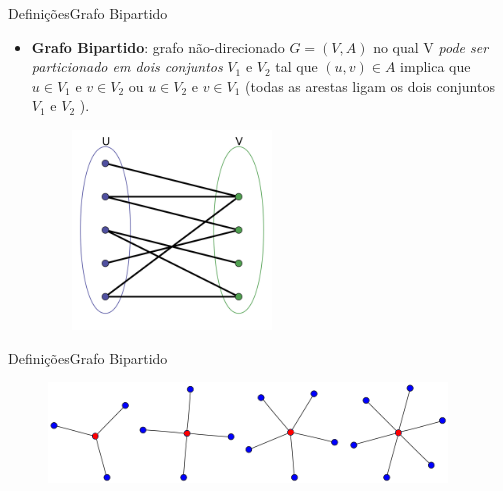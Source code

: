 \documentclass[aspectratio=169]{beamer}
\begin{document}

\begin{frame}{Definições}{Grafo Bipartido}
\begin{itemize}
\item {\bf Grafo Bipartido}: grafo não-direcionado $G = (V, A)$ no qual V {\it pode ser particionado em dois conjuntos} $V_1$ e $V_2$ tal que $(u, v) \in A$ implica que $u \in V_1$ e $v \in V_2$ ou $u \in V_2$ e $v \in V_1$ (todas as arestas ligam os dois conjuntos $V_1$ e $V_2$ ).

\begin{figure}[!h]
  \centering
  \includegraphics[width=150pt]{imagens/exemplo_grafo_bipartido.png}
  \label{fig_exemplo_grafo_bipartido}
\end{figure}
\end{itemize}
\end{frame}


\begin{frame}{Definições}{Grafo Bipartido}
\begin{figure}[!h]
  \centering
  \includegraphics[width=300pt]{imagens/exemplo_grafo_bipartido1.png}
  \label{fig_exemplo_grafo_bipartido1}
\end{figure}
\end{frame}

\end{document}

